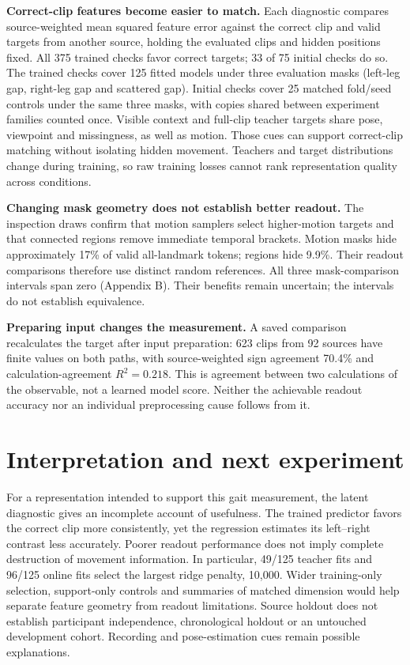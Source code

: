 \documentclass{article}
\begin{document}
\textbf{Correct-clip features become easier to match.} Each diagnostic
compares source-weighted mean squared feature error against the correct
clip and valid targets from another source, holding the evaluated clips
and hidden positions fixed. All 375 trained checks favor correct
targets; 33 of 75 initial checks do so. The trained checks cover 125
fitted models under three evaluation masks (left-leg gap, right-leg gap
and scattered gap). Initial checks cover 25 matched fold/seed controls
under the same three masks, with copies shared between experiment
families counted once. Visible context and full-clip teacher targets
share pose, viewpoint and missingness, as well as motion. Those cues can
support correct-clip matching without isolating hidden movement.
Teachers and target distributions change during training, so raw
training losses cannot rank representation quality across conditions.

\textbf{Changing mask geometry does not establish better readout.} The
inspection draws confirm that motion samplers select higher-motion
targets and that connected regions remove immediate temporal brackets.
Motion masks hide approximately 17\% of valid all-landmark tokens;
regions hide 9.9\%. Their readout comparisons therefore use distinct
random references. All three mask-comparison intervals span zero
(Appendix B). Their benefits remain uncertain; the intervals do not
establish equivalence.

\textbf{Preparing input changes the measurement.} A saved comparison
recalculates the target after input preparation: 623 clips from 92
sources have finite values on both paths, with source-weighted sign
agreement 70.4\% and calculation-agreement \(R^2=0.218\). This is
agreement between two calculations of the observable, not a learned
model score. Neither the achievable readout accuracy nor an individual
preprocessing cause follows from it.

\section{Interpretation and next
experiment}\label{interpretation-and-next-experiment}

For a representation intended to support this gait measurement, the
latent diagnostic gives an incomplete account of usefulness. The trained
predictor favors the correct clip more consistently, yet the regression
estimates its left--right contrast less accurately. Poorer readout
performance does not imply complete destruction of movement information.
In particular, 49/125 teacher fits and 96/125 online fits select the
largest ridge penalty, 10,000. Wider training-only selection,
support-only controls and summaries of matched dimension would help
separate feature geometry from readout limitations. Source holdout does
not establish participant independence, chronological holdout or an
untouched development cohort. Recording and pose-estimation cues remain
possible explanations.
\end{document}
